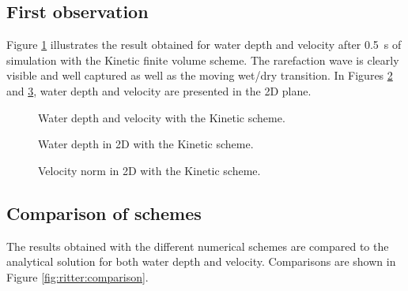 \subsection{First observation}

Figure \ref{fig:ritter:firstobs1d} illustrates the result obtained for water
depth and velocity after 0.5~s of simulation with the Kinetic finite volume scheme.
The rarefaction wave is clearly visible and well
captured as well as the moving wet/dry transition.
In Figures \ref{fig:ritter:Hfirstobs1d} and  \ref{fig:ritter:Ufirstobs1d},
water depth and velocity are presented in the 2D plane.

\begin{figure}[H]
\begin{minipage}[t]{0.5\textwidth}
 \centering
\end{minipage}
\begin{minipage}[t]{0.5\textwidth}
 \centering
\end{minipage}
  \caption{Water depth and velocity with the Kinetic scheme.}
  \label{fig:ritter:firstobs1d}
\end{figure}

\begin{figure}[H]
 \centering
  \caption{Water depth in 2D with the Kinetic scheme.}
  \label{fig:ritter:Hfirstobs1d}
\end{figure}

\begin{figure}[H]
 \centering
  \caption{Velocity norm in 2D with the Kinetic scheme.}
  \label{fig:ritter:Ufirstobs1d}
\end{figure}

\subsection{Comparison of schemes}

The results obtained with the different numerical schemes are compared to the
analytical solution for both water depth and velocity.
Comparisons are shown in Figure \ref{fig:ritter:comparison}.

